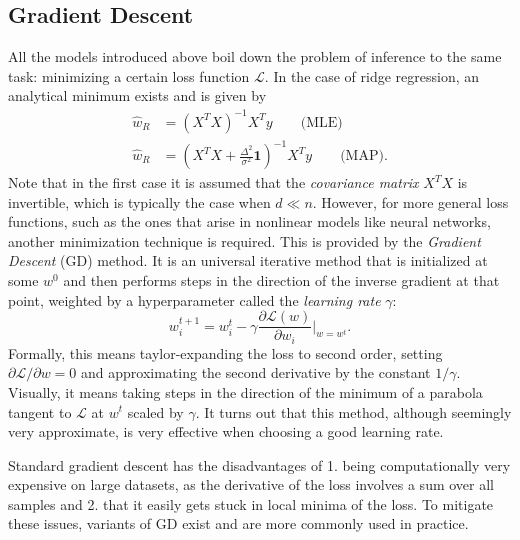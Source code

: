 \documentclass{article}
\begin{document}
\subsection{Gradient Descent}
All the models introduced above boil down the problem of inference to the same task: minimizing a certain loss function $\mathcal{L}$. In the case of ridge regression, an analytical minimum exists and is given by
\begin{align}
    \hat{w}_{R} &=(X^TX)^{-1}X^Ty \quad\quad\text{(MLE)} \\
    \hat{w}_{R} &=(X^TX + \frac{\Delta^2}{\sigma^2}\mathbf{1})^{-1}X^Ty \quad\quad\text{(MAP)}.
\end{align}
Note that in the first case it is assumed that the \emph{covariance matrix} $X^TX$ is invertible, which is typically the case when $d\ll n$.
However, for more general loss functions, such as the ones that arise in nonlinear models like neural networks, another minimization technique is required. This is provided by the \emph{Gradient Descent} (GD) method. It is an universal iterative method that is initialized at some $w^0$ and then performs steps in the direction of the inverse gradient at that point, weighted by a hyperparameter called the \emph{learning rate} $\gamma$:
\begin{equation}
    w_i^{t+1} = w_i^{t} - \gamma\frac{\partial\mathcal{L}(w)}{\partial w_i}\bigg |_{w=w^t}.
\end{equation}
Formally, this means taylor-expanding the loss to second order, setting $\partial\mathcal{L}/\partial w = 0$ and approximating the second derivative by the constant $1/\gamma$. Visually, it means taking steps in the direction of the minimum of a parabola tangent to $\mathcal{L}$ at $w^t$ scaled by $\gamma$. It turns out that this method, although seemingly very approximate, is very effective when choosing a good learning rate.

Standard gradient descent has the disadvantages of 1. being computationally very expensive on large datasets, as the derivative of the loss involves a sum over all samples and 2. that it easily gets stuck in local minima of the loss. To mitigate these issues, variants of GD exist and are more commonly used in practice.
\end{document}
